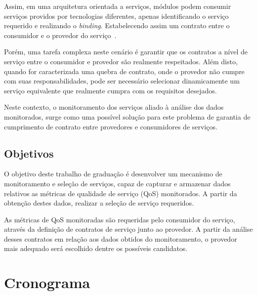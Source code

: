 Assim, em uma arquitetura orientada a serviços, módulos podem consumir serviços providos por tecnologias diferentes, apenas identificando o serviço requerido e realizando o \textit{binding}. Estabelecendo assim um contrato entre o consumidor e o provedor do serviço~\cite{oracle2005ws}.  

Porém, uma tarefa complexa neste cenário é garantir que os contratos a nível de serviço entre o consumidor e provedor são realmente respeitados. Além disto, quando for caracterizada uma quebra de contrato, onde o provedor não cumpre com suas responsabilidades, pode ser necessário selecionar dinamicamente um serviço equivalente que realmente cumpra com os requisitos desejados.

Neste contexto, o monitoramento dos serviços aliado à análise dos dados monitorados, surge como uma possível solução para este problema de garantia de cumprimento de contrato entre provedores e consumidores de serviços. 

\newpage
\section{Objetivos}
\label{pr:objectives}

O objetivo deste trabalho de graduação é desenvolver um mecanismo de monitoramento e seleção de serviços, capaz de capturar e armazenar dados relativos as métricas de qualidade de serviço (QoS) monitorados. A partir da obtenção destes dados,  realizar a seleção de serviço requeridos.

As métricas de QoS monitoradas são requeridas pelo consumidor do serviço, através da definição de contratos de serviço junto ao provedor. A partir da análise desses contratos em relação aos dados obtidos do monitoramento, o provedor mais adequado será escolhido dentre os possíveis candidatos.

\newpage
\chapter{Cronograma}
\label{pr:chrono}


